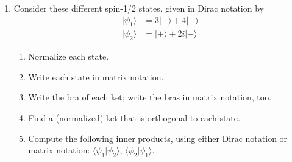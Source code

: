 \documentclass[10pt, letterpaper, twoside, openany]{article}
\newcommand{\ket}[1]{| #1 \rangle}
\newcommand{\braket}[2]{\langle #1 | #2 \rangle}
\begin{document}
\begin{enumerate}
\begin{enumerate}
\item Suppose you hit the 10k button, sending 10,000 particles through the experiment.  What is the maximum possible value (approximately) that would be counted?  What about the minimum?  Feel free to set up the experiment yourself to see.

\vspace{1.5in}

\item Suppose the second analyzer is oriented along the $z$ direction.  Then you send in just one particle, and that particle ends up being detected at the counter.  What can you conclude about what the first analyzer must be (or what it must not be)?

\end{enumerate}

\newpage

\item Consider these different spin-1/2 states, given in Dirac notation by
\begin{align*}
\ket{\psi_1} &= 3 \ket{+} + 4\ket{-} \\
\ket{\psi_2} &= \ket{+} + 2i \ket{-}
\end{align*}
\begin{enumerate}
\item Normalize each state.

\vspace{2in}

\item Write each state in matrix notation.

\vspace{2in}

\item Write the bra of each ket; write the bras in matrix notation, too.

\newpage

\item Find a (normalized) ket that is orthogonal to each state.

\vspace{4in}

\item Compute the following inner products, using either Dirac notation or matrix notation:  $\braket{\psi_1}{\psi_2}$, $\braket{\psi_2}{\psi_1}$.
\end{enumerate}

\end{enumerate}
\end{document}
